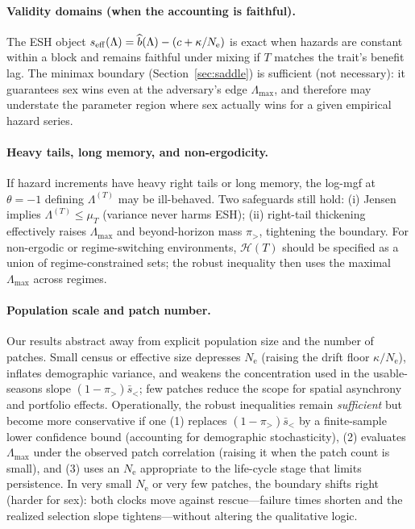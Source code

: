 \documentclass[11pt]{article}
\theoremstyle{upright}
\newcommand{\horizon}{\Lambda}
\newcommand{\Ne}{N_{\mathrm{e}}}
\newcommand{\seff}[1][]{s_{\mathrm{eff}\if\relax\detokenize{#1}\relax\else,#1\fi}}
\newcommand{\Lmax}{\horizon^{(T)}_{\max}}
\newcommand{\hazT}[1]{\Lambda^{(#1)}}          %
\renewcommand{\Lmax}{\Lambda_{\max}}
\begin{document}
\paragraph{Validity domains (when the accounting is faithful).}
The ESH object $\seff(\Lambda)=\widehat b(\Lambda)-(c+\kappa/\Ne)$ is exact when hazards are constant within a block and remains faithful under mixing if $T$ matches the trait’s benefit lag. The minimax boundary (Section~\ref{sec:saddle}) is sufficient (not necessary): it guarantees sex wins even at the adversary’s edge $\Lmax$, and therefore may understate the parameter region where sex actually wins for a given empirical hazard series.

\paragraph{Heavy tails, long memory, and non-ergodicity.}
If hazard increments have heavy right tails or long memory, the log-mgf at $\theta=-1$ defining $\hazT{T}$ may be ill-behaved. Two safeguards still hold: (i) Jensen implies $\hazT{T}\le \mu_T$ (variance never harms ESH); (ii) right-tail thickening effectively raises $\Lmax$ and beyond-horizon mass $\pi_{>}$, tightening the boundary. For non-ergodic or regime-switching environments, $\mathcal H(T)$ should be specified as a union of regime-constrained sets; the robust inequality then uses the maximal $\Lmax$ across regimes.

\paragraph{Population scale and patch number.}
Our results abstract away from explicit population size and the number of patches.
Small census or effective size depresses $\Ne$ (raising the drift floor $\kappa/\Ne$),
inflates demographic variance, and weakens the concentration used in the usable-seasons slope
$(1-\pi_{>})\bar s_{<}$; few patches reduce the scope for spatial asynchrony and portfolio effects.
Operationally, the robust inequalities remain \emph{sufficient} but become more conservative if one
(1) replaces $(1-\pi_{>})\bar s_{<}$ by a finite-sample lower confidence bound (accounting for demographic
stochasticity), (2) evaluates $\Lmax$ under the observed patch correlation (raising it when the patch count is small),
and (3) uses an $\Ne$ appropriate to the life-cycle stage that limits persistence. In very small $\Ne$ or very few
patches, the boundary shifts right (harder for sex): both clocks move against rescue—failure times shorten and the
realized selection slope tightens—without altering the qualitative logic.
\end{document}
